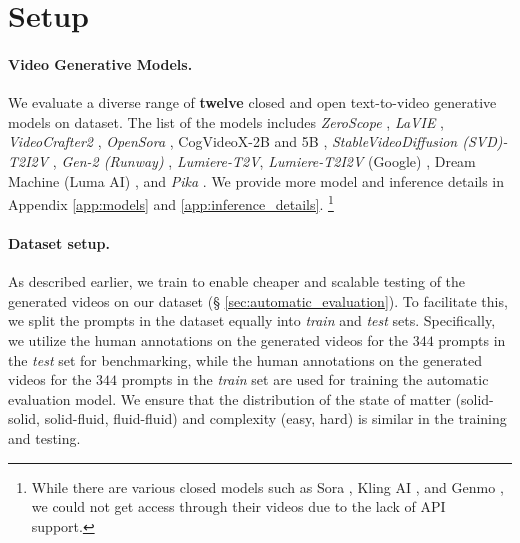 \section{Setup}
\label{sec:setup}


\paragraph{Video Generative Models.}
\label{sec:t2v_generative_model}

We evaluate a diverse range of \textbf{twelve} closed and open text-to-video generative models on \name{} dataset. The list of the models includes \textit{ZeroScope} \cite{zeroscope}, \textit{LaVIE} \cite{wang2023lavie}, \textit{VideoCrafter2} \cite{chen2024videocrafter2}, \textit{OpenSora} \cite{OpenSora}, CogVideoX-2B and 5B \cite{yang2024cogvideox}, \textit{StableVideoDiffusion (SVD)-T2I2V} \cite{blattmann2023stable}, \textit{Gen-2 (Runway)} \cite{gen2}, \textit{Lumiere-T2V}, \textit{Lumiere-T2I2V} (Google) \cite{bar2024lumiere}, Dream Machine (Luma AI) \cite{lumalabsLumaDream}, and \textit{Pika} \cite{pika}. 
We provide more model and inference details in Appendix \ref{app:models} and \ref{app:inference_details}. \footnote{While there are various closed models such as Sora \cite{liu2024sora}, Kling AI \cite{klingai}, and Genmo \cite{genmo}, we could not get access through their videos due to the lack of API support.}


\paragraph{Dataset setup.}
\label{sec:setup_dataset}


As described earlier, we train \model{} to enable cheaper and scalable testing of the generated videos on our dataset (§ \ref{sec:automatic_evaluation}). To facilitate this, we split the prompts in the \name{} dataset equally into \textit{train} and \textit{test} sets. Specifically, we utilize the human annotations on the generated videos for the $344$ prompts in the \textit{test} set for benchmarking, while the human annotations on the generated videos for the $344$ prompts in the \textit{train} set are used for training the automatic evaluation model. We ensure that the distribution of the state of matter (solid-solid, solid-fluid, fluid-fluid) and complexity (easy, hard) is similar in the training and testing.

